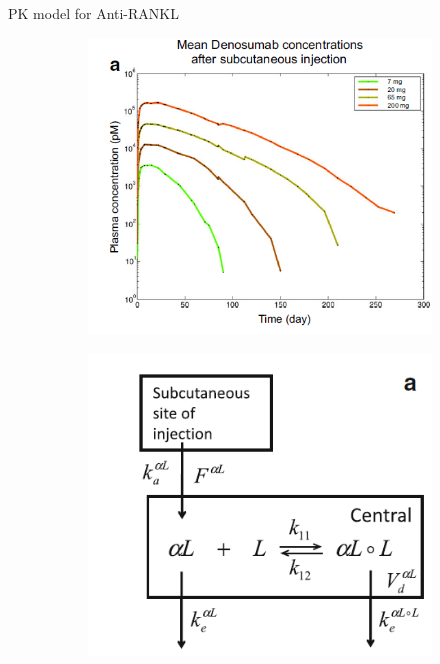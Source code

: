 \documentclass{beamer}
\begin{document}
\begin{frame}{PK model for Anti-RANKL}
	\begin{figure}[h]
	\centering
	\begin{subfigure}{0.4\textwidth}
		\includegraphics[scale=0.45]{../Figures/fig_lemaire_fig9a.png}
	\end{subfigure}
	\begin{subfigure}{0.4\textwidth}
	\includegraphics[scale=0.45]{../Figures/fig_lemaire_fig10a.png}
	\end{subfigure}
\end{figure}
	

\end{frame}
\end{document}
